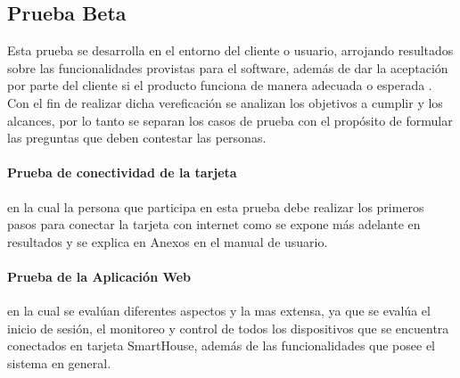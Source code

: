 
\subsection{Prueba Beta}

Esta prueba se desarrolla en el entorno del cliente o usuario, arrojando resultados sobre las funcionalidades provistas para el software, además de dar la aceptación por parte del cliente si el producto funciona de manera adecuada o esperada \cite{PB}. Con el fin de realizar dicha vereficación se analizan los objetivos a cumplir y los alcances, por lo tanto se separan los casos de prueba con el propósito de formular las preguntas que deben contestar las personas.\\

\paragraph{Prueba de conectividad de la tarjeta} en la cual la persona que participa en esta prueba debe realizar los primeros pasos para conectar la tarjeta con internet como se expone más adelante en resultados y se explica en Anexos en el manual de usuario.\\

\paragraph{Prueba de la Aplicación Web} en la cual se evalúan diferentes aspectos y la mas extensa, ya que se evalúa el inicio de sesión, el monitoreo y control de todos los dispositivos que se encuentra conectados en tarjeta SmartHouse, además de las funcionalidades que posee el sistema en general.\\